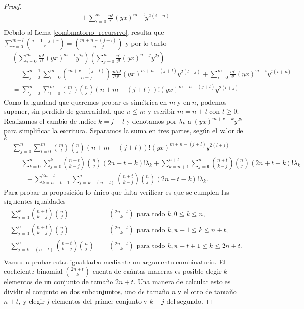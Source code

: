 \documentclass[fleqn,../tesis.tex]{subfiles}
\begin{document}
\begin{proof}
\begin{align*}
		 + \sum_{i = 0}^{m}\frac{m!}{i!}(yx)^{m - i}y^{2(i + n)}\\
	\end{align*}
	Debido al Lema \ref{combinatorio_recursivo}, resulta que
	$\sum_{r = 0}^{m - l}\binom{n - 1 - j + r}{r} = \binom{m + n - (j + l)}{n - j}$ y por lo tanto
	\begin{align*}
		&\left(\sum_{i = 0}^{m}\frac{m!}{i!}(yx)^{m - i}y^{2i}\right)
			\left(\sum_{j = 0}^{n}\frac{n!}{j!}(yx)^{n - j}y^{2j}\right)\\
		&=\sum_{j = 0}^{n - 1}\sum_{l = 0}^{m}
			\binom{m + n - (j + l)}{n - j}\frac{m!n!}{l!j!}(yx)^{m + n - (j + l)}y^{2(l + j)}
		+ \sum_{i = 0}^{m}\frac{m!}{i!}(yx)^{m - i}y^{2(i + n)}\\
		&= \sum_{j = 0}^{n}\sum_{l = 0}^{m}
			\binom{m}{l}\binom{n}{j}(n + m - (j + l))!(yx)^{m + n - (j + l)}y^{2(l + j)}.
	\end{align*}
	Como la igualdad que queremos probar es simétrica en $m$ y en $n$, podemos
	suponer, sin perdida de generalidad, que $n \leq m$ y escribir $m = n + t$ con $t \geq 0$.
	Realizamos el cambio de índice $k = j + l$
	y denotamos por $\lambda_k$ a $(yx)^{m + n - k}y^{2k}$ para simplificar la escritura.
	Separamos la suma en tres partes, según el valor de $k$
	\begin{align*}
		&\sum_{j = 0}^{n}\sum_{l = 0}^{m}
			\binom{m}{l}\binom{n}{j}(n + m - (j + l))!(yx)^{m + n - (j + l)}y^{2(l + j)}\\
		&= \sum_{k = 0}^{n}\sum_{j = 0}^{k}
			\binom{n + t}{k - j}\binom{n}{j}(2n + t -k)!\lambda_k
			 +\sum_{k = n + 1}^{n + t}\sum_{j = 0}^{n}
			\binom{n + t}{k - j}\binom{n}{j}(2n + t -k)!\lambda_k\\
		&\qquad  +\sum_{k = n + t  + 1}^{2n + t}\sum_{j = k - (n + t)}^{n}
			\binom{n + t}{k - j}\binom{n}{j}(2n + t -k)!\lambda_k.
	\end{align*}
	Para probar la proposición lo único que falta verificar es que se cumplen las siguientes igualdades
	\begin{align*}
		\sum_{j = 0}^{k}\binom{n + t}{k - j}\binom{n}{j} &= \binom{2n + t}{k} \text{ para todo }k, 0\leq k \leq n,\\
		\sum_{j = 0}^{n}\binom{n + t}{k - j}\binom{n}{j} &= \binom{2n + t}{k}
			\text{ para todo }k, n + 1 \leq k \leq n + t,\\
		\sum_{j = k - (n + t)}^{n}\binom{n + t}{k - j}\binom{n}{j} &= \binom{2n + t}{k}
			\text{ para todo }k, n + t + 1 \leq k \leq 2n + t.\\
	\end{align*}
	Vamos a probar estas igualdades mediante un argumento combinatorio.
	El coeficiente binomial $\binom{2n + t}{k}$ cuenta de cuántas maneras es posible elegir
	$k$ elementos de un conjunto de tamaño $2n + t$. Una manera de calcular esto es dividir
	el conjunto en dos subconjuntos, uno de tamaño $n$ y el otro de tamaño $n + t$, y elegir
	$j$ elementos del primer conjunto y $k - j$ del segundo.
\end{proof}
\end{document}

